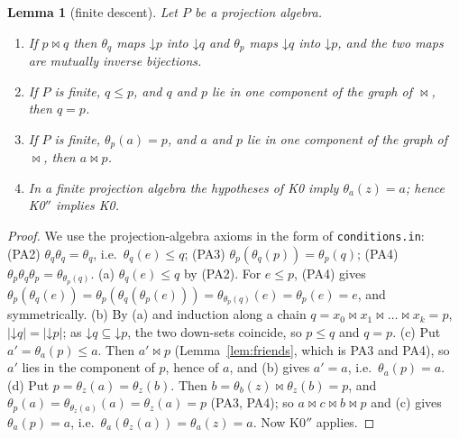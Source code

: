 \documentclass[11pt]{amsart}
\newtheorem{lemma}[theorem]{Lemma}
\theoremstyle{definition}
\newcommand{\mt}{\bowtie}   %
\begin{document}
\begin{lemma}[finite descent]\label{lem:descent}
Let $P$ be a projection algebra.
\begin{enumerate}[nosep,label=\textup{(\alph*)}]
\item If $p\mt q$ then $\theta_q$ maps $\mathord\downarrow p$ into $\mathord\downarrow q$ and $\theta_p$ maps $\mathord\downarrow q$ into $\mathord\downarrow p$, and the two maps are mutually inverse bijections.
\item If $P$ is finite, $q\le p$, and $q$ and $p$ lie in one component of the graph of $\mt$, then $q=p$.
\item If $P$ is finite, $\theta_p(a)=p$, and $a$ and $p$ lie in one component of the graph of $\mt$, then $a\mt p$.
\item In a finite projection algebra the hypotheses of K0 imply $\theta_a(z)=a$; hence K0$''$ implies K0.
\end{enumerate}
\end{lemma}

\begin{proof}
We use the projection-algebra axioms in the form of \texttt{conditions.in}: (PA2) $\theta_q\theta_q=\theta_q$, i.e.\ $\theta_q(e)\le q$; (PA3) $\theta_p(\theta_q(p))=\theta_p(q)$; (PA4) $\theta_p\theta_q\theta_p=\theta_{\theta_p(q)}$. (a) $\theta_q(e)\le q$ by (PA2). For $e\le p$, (PA4) gives $\theta_p(\theta_q(e))=\theta_p(\theta_q(\theta_p(e)))=\theta_{\theta_p(q)}(e)=\theta_p(e)=e$, and symmetrically. (b) By (a) and induction along a chain $q=x_0\mt x_1\mt\dots\mt x_k=p$, $|\mathord\downarrow q|=|\mathord\downarrow p|$; as $\mathord\downarrow q\subseteq\mathord\downarrow p$, the two down-sets coincide, so $p\le q$ and $q=p$. (c) Put $a'=\theta_a(p)\le a$. Then $a'\mt p$ (Lemma~\ref{lem:friends}, which is PA3 and PA4), so $a'$ lies in the component of $p$, hence of $a$, and (b) gives $a'=a$, i.e.\ $\theta_a(p)=a$. (d) Put $p=\theta_z(a)=\theta_z(b)$. Then $b=\theta_b(z)\mt\theta_z(b)=p$, and $\theta_p(a)=\theta_{\theta_z(a)}(a)=\theta_z(a)=p$ (PA3, PA4); so $a\mt c\mt b\mt p$ and (c) gives $\theta_a(p)=a$, i.e.\ $\theta_a(\theta_z(a))=\theta_a(z)=a$. Now K0$''$ applies.
\end{proof}
\end{document}
